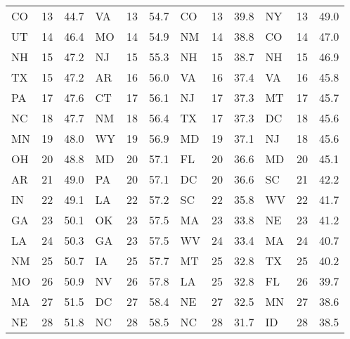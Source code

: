 \begin{longtable}{lrr|lrr||lrr|lrr}
        CO &   13 &  44.7 &            VA &   13 &   54.7 &             CO &   13 &   39.8 &            NY &   13 &   49.0 \\
        UT &   14 &  46.4 &            MO &   14 &   54.9 &             NM &   14 &   38.8 &            CO &   14 &   47.0 \\
        NH &   15 &  47.2 &            NJ &   15 &   55.3 &             NH &   15 &   38.7 &            NH &   15 &   46.9 \\
        TX &   15 &  47.2 &            AR &   16 &   56.0 &             VA &   16 &   37.4 &            VA &   16 &   45.8 \\
        PA &   17 &  47.6 &            CT &   17 &   56.1 &             NJ &   17 &   37.3 &            MT &   17 &   45.7 \\
        NC &   18 &  47.7 &            NM &   18 &   56.4 &             TX &   17 &   37.3 &            DC &   18 &   45.6 \\
        MN &   19 &  48.0 &            WY &   19 &   56.9 &             MD &   19 &   37.1 &            NJ &   18 &   45.6 \\
        OH &   20 &  48.8 &            MD &   20 &   57.1 &             FL &   20 &   36.6 &            MD &   20 &   45.1 \\
        AR &   21 &  49.0 &            PA &   20 &   57.1 &             DC &   20 &   36.6 &            SC &   21 &   42.2 \\
        IN &   22 &  49.1 &            LA &   22 &   57.2 &             SC &   22 &   35.8 &            WV &   22 &   41.7 \\
        GA &   23 &  50.1 &            OK &   23 &   57.5 &             MA &   23 &   33.8 &            NE &   23 &   41.2 \\
        LA &   24 &  50.3 &            GA &   23 &   57.5 &             WV &   24 &   33.4 &            MA &   24 &   40.7 \\
        NM &   25 &  50.7 &            IA &   25 &   57.7 &             MT &   25 &   32.8 &            TX &   25 &   40.2 \\
        MO &   26 &  50.9 &            NV &   26 &   57.8 &             LA &   25 &   32.8 &            FL &   26 &   39.7 \\
        MA &   27 &  51.5 &            DC &   27 &   58.4 &             NE &   27 &   32.5 &            MN &   27 &   38.6 \\
        NE &   28 &  51.8 &            NC &   28 &   58.5 &             NC &   28 &   31.7 &            ID &   28 &   38.5 \\

\end{longtable}
